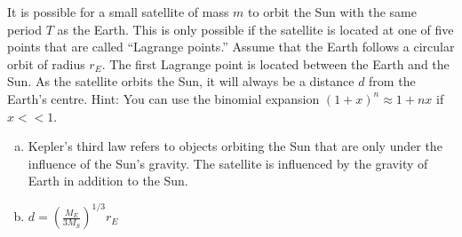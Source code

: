 \question It is possible for a small satellite of mass $m$ to orbit the Sun with the same period $T$ as the Earth. This is only possible if the satellite is located at one of five points that are called ``Lagrange points.'' Assume that the Earth follows a circular orbit of radius $r_E$. The first Lagrange point is located between the Earth and the Sun. As the satellite orbits the Sun, it will always be a distance $d$ from the Earth's centre. Hint: You can use the binomial expansion $(1+x)^n\approx 1+nx$ if $x<<1$.
\begin{finalanswer}
\begin{enumerate}[(a)]
\item Kepler's third law refers to objects orbiting the Sun that are only under the influence of the Sun's gravity. The satellite is influenced by the gravity of Earth in addition to the Sun. 
\item $d=\left(\frac{M_E}{3M_S}\right)^{1/3}r_E$
\end{enumerate}
\end{finalanswer}
